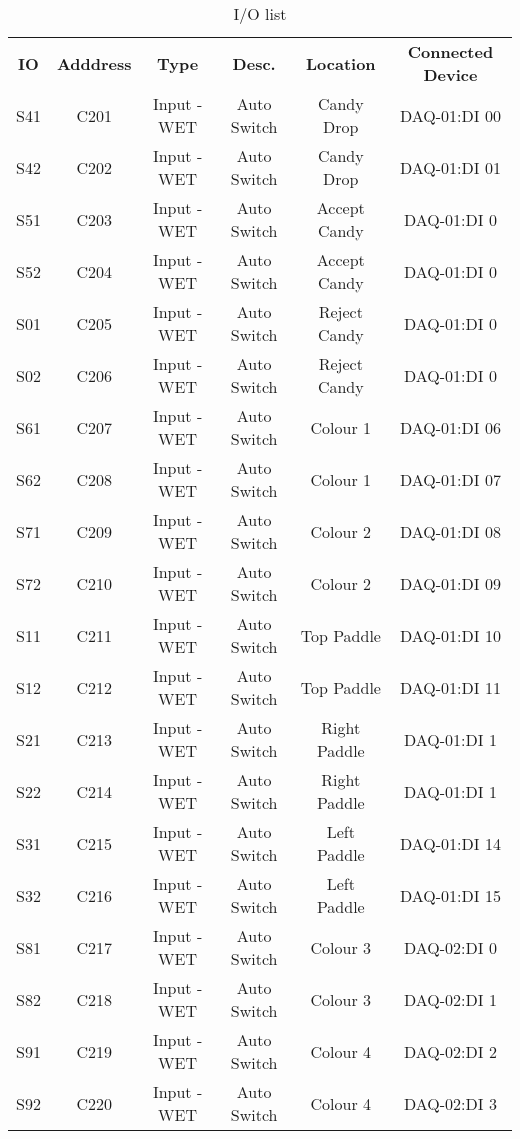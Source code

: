 \begin{center}
    \begin{longtable}[c]{ |c|c|c|c|c|c| }
        \caption{I/O list}\\
        \hline
        \textbf{IO}	&	\textbf{Adddress}	&	\textbf{Type}	&	\textbf{Desc.}	&	\textbf{Location} & \textbf{Connected Device}\\
        S41	&	C201	&	Input - WET	&	Auto Switch	&	Candy Drop	&	DAQ-01:DI 00\\
        S42	&	C202	&	Input - WET	&	Auto Switch	&	Candy Drop	&	DAQ-01:DI 01\\
        S51	&	C203	&	Input - WET	&	Auto Switch	&	Accept Candy	&	DAQ-01:DI 0\\
        S52	&	C204	&	Input - WET	&	Auto Switch	&	Accept Candy	&	DAQ-01:DI 0\\
        S01	&	C205	&	Input - WET	&	Auto Switch	&	Reject Candy	&	DAQ-01:DI 0\\
        S02	&	C206	&	Input - WET	&	Auto Switch	&	Reject Candy	&	DAQ-01:DI 0\\
        S61	&	C207	&	Input - WET	&	Auto Switch	&	Colour 1	&	DAQ-01:DI 06\\
        S62	&	C208	&	Input - WET	&	Auto Switch	&	Colour 1	&	DAQ-01:DI 07\\
        S71	&	C209	&	Input - WET	&	Auto Switch	&	Colour 2	&	DAQ-01:DI 08\\
        S72	&	C210	&	Input - WET	&	Auto Switch	&	Colour 2	&	DAQ-01:DI 09\\
        S11	&	C211	&	Input - WET	&	Auto Switch	&	Top Paddle	&	DAQ-01:DI 10\\
        S12	&	C212	&	Input - WET	&	Auto Switch	&	Top Paddle	&	DAQ-01:DI 11\\
        S21	&	C213	&	Input - WET	&	Auto Switch	&	Right Paddle	&	DAQ-01:DI 1\\
        S22	&	C214	&	Input - WET	&	Auto Switch	&	Right Paddle	&	DAQ-01:DI 1\\
        S31	&	C215	&	Input - WET	&	Auto Switch	&	Left Paddle	&	DAQ-01:DI 14\\
        S32	&	C216	&	Input - WET	&	Auto Switch	&	Left Paddle	&	DAQ-01:DI 15\\
        S81	&	C217	&	Input - WET	&	Auto Switch	&	Colour 3	&	DAQ-02:DI 0\\
        S82	&	C218	&	Input - WET	&	Auto Switch	&	Colour 3	&	DAQ-02:DI 1\\
        S91	&	C219	&	Input - WET	&	Auto Switch	&	Colour 4	&	DAQ-02:DI 2\\
        S92	&	C220	&	Input - WET	&	Auto Switch	&	Colour 4	&	DAQ-02:DI 3\\

\end{longtable}
\end{center}
